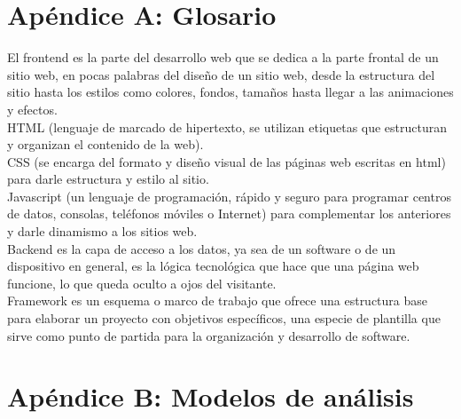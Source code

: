 \documentclass{scrreprt}
\begin{document}
	\chapter*{Apéndice A: Glosario}
El frontend es la parte del desarrollo web que se dedica a la parte frontal de un sitio web, en pocas palabras del diseño de un sitio web, desde la estructura del sitio hasta los estilos como colores, fondos, tamaños hasta llegar a las animaciones y efectos.\\

HTML (lenguaje de marcado de hipertexto, se utilizan etiquetas que estructuran y organizan el contenido de la web). \\

CSS (se encarga del formato y diseño visual de las páginas web escritas en html) para darle estructura y estilo al sitio. \\

Javascript (un lenguaje de programación, rápido y seguro para programar centros de datos, consolas, teléfonos móviles o Internet) para complementar los anteriores y darle dinamismo a los sitios web. \\

Backend es la capa de acceso a los datos, ya sea de un software o de un dispositivo en general, es la lógica tecnológica que hace que una página web funcione, lo que queda oculto a ojos del visitante.\\

Framework es un esquema o marco de trabajo que ofrece una estructura base para elaborar un proyecto con objetivos específicos, una especie de plantilla que sirve como punto de partida para la organización y desarrollo de software.\\
		
	\chapter*{Apéndice B: Modelos de análisis}
\end{document}
